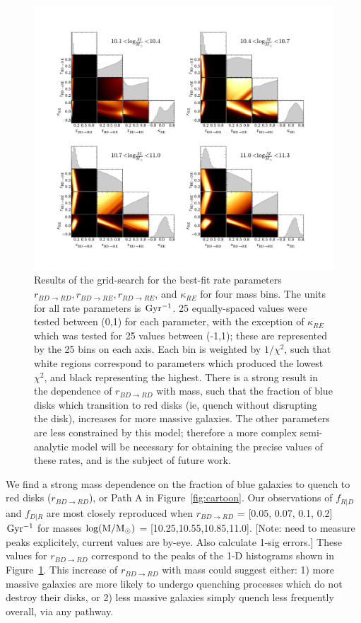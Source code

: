 \documentclass[useAMS,usenatbib]{mn2e}
\begin{document}
\begin{figure}
\centering
\includegraphics[width=\textwidth,trim={0cm 0cm 2cm 1cm},clip]{figures/corner_plot.pdf}
\caption{Results of the grid-search for the best-fit rate parameters $r_{BD \rightarrow RD}, r_{BD \rightarrow RE}, r_{RD \rightarrow RE}$, and $\kappa_{RE}$ for four mass bins. The units for all rate parameters is $\rm Gyr^{-1}$. 25 equally-spaced values were tested between (0,1) for each parameter, with the exception of $\kappa_{RE}$ which was tested for 25 values between (-1,1); these are represented by the 25 bins on each axis. Each bin is weighted by $1/\chi^2$, such that white regions correspond to parameters which produced the lowest $\chi^2$, and black representing the highest. There is a strong result in the dependence of $r_{BD \rightarrow RD}$ with mass, such that the fraction of blue disks which transition to red disks (ie, quench without disrupting the disk), increases for more massive galaxies. The other parameters are less constrained by this model; therefore a more complex semi-analytic model will be necessary for obtaining the precise values of these rates, and is the subject of future work.}
\label{fig:corner}
\end{figure} 

We find a strong mass dependence on the fraction of blue galaxies to quench to red disks ($r_{BD \rightarrow RD}$), or Path A in Figure~\ref{fig:cartoon}. Our observations of $f_{R|D}$ and $f_{D|R}$ are most closely reproduced when $r_{BD \rightarrow RD}$ = [0.05, 0.07, 0.1, 0.2] $\rm Gyr^{-1}$ for masses $\rm log(M/M_{\odot})$ = [10.25,10.55,10.85,11.0]. [Note: need to measure peaks explicitely, current values are by-eye. Also calculate 1-sig errors.] These values for $r_{BD \rightarrow RD}$ correspond to the peaks of the 1-D histograms shown in Figure~\ref{fig:corner}. This increase of $r_{BD \rightarrow RD}$ with mass could suggest either: 1) more massive galaxies are more likely to undergo quenching processes which do not destroy their disks, or 2) less massive galaxies simply quench less frequently overall, via any pathway. 
\end{document}
